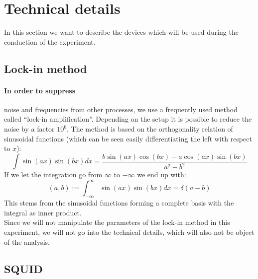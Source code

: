 \section{Technical details}
\label{sec:techniques}
In this section we want to describe the devices which will be used during the
conduction of the experiment.
\subsection{Lock-in method}
\paragraph{In order to suppress}
noise and frequencies from other processes, we use
a frequently used method called ``lock-in amplification''. Depending on the
setup it is possible to reduce the noise by a factor $10^6$. The method
is based on the orthogonality relation of sinusoidal functions (which
    can be seen easily differentiating the left with respect to $x$):
\begin{equation}
    \int \sin(a x) \sin(b x) dx =\frac{ b \sin(a x) \cos(b x)-a \cos(a x)
        \sin(b x)}{a^2-b^2}
\end{equation}
If we let the integration go from $\infty$ to $-\infty$ we end up with:
\begin{equation}
    (a,b) := \int_{-\infty}^{\infty} \sin(a x) \sin(b x) dx = \delta(a - b)
\end{equation}
This stems from the sinusoidal functions forming a complete basis with
the integral as inner product.\\
Since we will not manipulate the parameters of the lock-in method in this
experiment, we will not go into the technical details, which
will also not be object of the analysis.
\subsection{SQUID}
